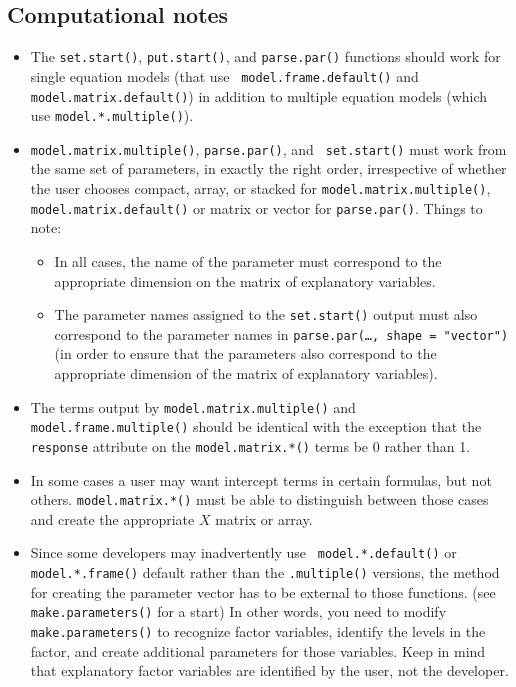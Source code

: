 \documentclass[oneside,letterpaper,12pt]{article}
\begin{document}
\subsection{Computational notes}  

\begin{itemize}
\item The {\tt set.start()}, {\tt put.start()}, and {\tt parse.par()}
functions should work for single equation models (that use {\tt
model.frame.default()} and {\tt model.matrix.default()}) in addition
to multiple equation models (which use {\tt model.*.multiple()}).  

\item {\tt model.matrix.multiple()}, {\tt parse.par()}, and {\tt
set.start()} must work from the same set of parameters, in exactly the
right order, irrespective of whether the user chooses compact, array,
or stacked for {\tt model.matrix.multiple()}, {\tt
model.matrix.default()} or matrix or vector for {\tt parse.par()}.
Things to note:
\begin{itemize}  
\item In all cases, the name of the parameter must correspond to the
appropriate dimension on the matrix of explanatory variables.  

\item The parameter names assigned to the {\tt set.start()} output
must also correspond to the parameter names in {\tt parse.par(\dots,
shape = "vector")} (in order to ensure that the parameters also
correspond to the appropriate dimension of the matrix of explanatory
variables).  
\end{itemize}

\item The terms output by {\tt model.matrix.multiple()} and {\tt
model.frame.multiple()} should be identical with the exception that
the {\tt response} attribute on the {\tt model.matrix.*()} terms be 0
rather than 1.  

\item In some cases a user may want intercept terms in certain
formulas, but not others.  {\tt model.matrix.*()} must be able to
distinguish between those cases and create the appropriate $X$ matrix
or array.  

\item Since some developers may inadvertently use {\tt
model.*.default()} or {\tt model.*.frame()} default rather than the
{\tt *.multiple()} versions, the method for creating the parameter
vector has to be external to those functions.  (see {\tt
make.parameters()} for a start) In other words, you need to modify
{\tt make.parameters()} to recognize factor variables, identify the
levels in the factor, and create additional parameters for those
variables.  Keep in mind that explanatory factor variables are
identified by the user, not the developer.

\end{itemize} 

 

\end{document}
